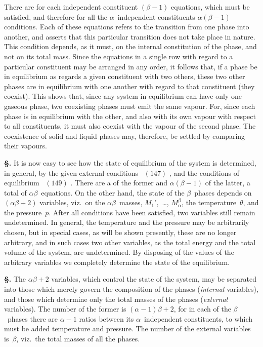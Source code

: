 \documentclass[12pt]{book}[2005/09/16]
\newcommand{\Chg}[2]{#2}
\newcommand{\Add}[1]{\Chg{}{#1}}
\newcommand{\Section}[1]{
  \medskip\par\textbf{§\;#1}
  \label{section:#1}
}
\newcommand{\Eq}[1]{%
  \hyperref[eqn:#1]{\ensuremath{#1}}%
}
\newcommand{\PageSep}[1]{\ignorespaces}
\begin{document}
There are for each independent constituent $(\beta - 1)$ equations,
which must be satisfied, and therefore for all the
$\alpha$~independent constituents $\alpha (\beta - 1)$ conditions. Each of
these equations refers to the transition from one phase into
another, and asserts that this particular transition does not
take place in nature. This condition depends, as it must,
on the internal constitution of the phase, and not on its
total mass. Since the equations in a single row with regard
to a particular constituent may be arranged in any order,
it follows that, if a phase be in equilibrium as regards a
\PageSep{178}
given constituent with two others, these two other phases
are in equilibrium with one another with regard to that
constituent (they coexist). This shows that, since any
system in equilibrium can have only one gaseous phase, two
coexisting phases must emit the same vapour. For, since
each phase is in equilibrium with the other, and also with
its own vapour with respect to all constituents, it must also
coexist with the vapour of the second phase. The coexistence
of solid and liquid phases may, therefore, be settled
by comparing their vapours.

\Section{203.} It is now easy to see how the state of equilibrium
%
%
%
of the system is determined, in general, by the given
external conditions~\Eq{(147)}, and the conditions of equilibrium~\Eq{(149)}.
There are a of the former and $\alpha(\beta - 1)$ of the latter,
a total of $\alpha\beta$~equations. On the other hand, the state of
the $\beta$~phases depends on $(\alpha\beta + 2)$ variables, viz.\ on the $\alpha\beta$~masses,
$M_{1}'$,~\dots\Add{,} $M_{\alpha}^{\beta}$, the temperature~$\theta$, and the pressure~$p$.
After all conditions have been satisfied, two variables still
remain undetermined. In general, the temperature and the
pressure may be arbitrarily chosen, but in special cases, as
will be shown presently, these are no longer arbitrary, and
in such cases two other variables, as the total energy and
the total volume of the system, are undetermined. By
disposing of the values of the arbitrary variables we completely
determine the state of the equilibrium.

\Section{204.} The $\alpha\beta + 2$ variables, which control the state of
the system, may be separated into those which merely
govern the composition of the phases (\emph{internal} variables),
and those which determine only the total masses of the
phases (\emph{external} variables). The number of the former is
$(\alpha - 1)\beta + 2$, for in each of the $\beta$~phases there are $\alpha - 1$
ratios between its $\alpha$~independent constituents, to which must
be added temperature and pressure. The number of the
external variables is~$\beta$, viz.\ the total masses of all the
phases.
\end{document}
